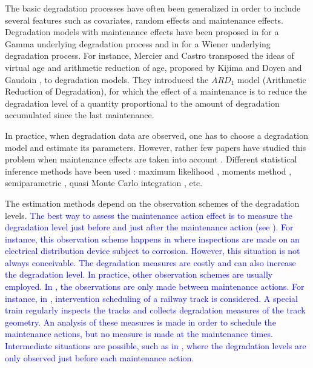 The basic degradation processes have often been generalized in order to include several features such as covariates, random effects and maintenance effects. Degradation models with maintenance effects have been proposed in \cite{van_condition-based_2012, mercier_stochastic_2019} for a Gamma underlying degradation process and in \cite{kahle_wiener_2010, zhang_degradation-based_2015, kahle_imperfect_2019, wang_modeling_2020} for a Wiener underlying degradation process.
For instance, Mercier and Castro  \cite{mercier_stochastic_2019} transposed the ideas of virtual age and arithmetic reduction of age, proposed by Kijima \cite{kijima_results_1989} and Doyen and Gaudoin \cite{doyen_classes_2004}, to degradation models. They introduced the $ARD_1$ model (Arithmetic Reduction of Degradation), for which the effect of a maintenance is to reduce the degradation level of a quantity proportional to the amount of degradation accumulated since the last maintenance.

In practice, when degradation data are observed, one has to choose a degradation model and estimate its parameters. However, rather few papers have studied this problem when maintenance effects are taken into account \cite{zhang_degradation-based_2015, giorgio_new_2018, salles_semiparametric_2020,kamranfar_inference_2021}. Different statistical inference methods have been used : maximum likelihood  \cite{kahle_wiener_2010, kamranfar_inference_2021}, moments method \cite{salles_modelling_2020}, semiparametric \cite{salles_modelling_2020}, quasi Monte Carlo integration \cite{zhang_degradation-based_2015}, etc. 

The estimation methods depend on the observation schemes of the degradation levels.
\textcolor{blue}{The best way to assess the maintenance action effect is to  measure the degradation level just before and just after the maintenance action (see \cite{zhao_optimal_2019,zhao_accelerated_2021}). For instance, this observation scheme happens in \cite{zhao_accelerated_2021} where inspections are made on an electrical distribution device subject to corrosion. However, this situation is not always conceivable. The degradation measures are costly and can also increase the degradation level. In practice, other observation schemes are usually employed. In \cite{mercier_bivariate_2012,zhang_degradation-based_2015, giorgio_new_2018}, the observations are only made between maintenance actions. For instance, in \cite{mercier_bivariate_2012}, intervention scheduling of a railway track is considered. A special train regularly inspects the tracks and collects degradation measures of the track geometry. An analysis of these measures is made in order to schedule the maintenance actions, but no measure is made at the maintenance times.
  Intermediate situations are possible, such as in \cite{salles_semiparametric_2020, kamranfar_inference_2021}, where the degradation levels are only observed just before each maintenance action. }

